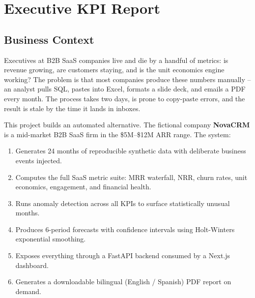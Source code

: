 
\chapter{Executive KPI Report}
\label{ch:kpi}

\section{Business Context}
\label{sec:kpi-context}


Executives at B2B SaaS companies live and die by a handful of metrics: is revenue growing, are customers staying, and is the unit economics engine working? The problem is that most companies produce these numbers manually -- an analyst pulls SQL, pastes into Excel, formats a slide deck, and emails a PDF every month. The process takes two days, is prone to copy-paste errors, and the result is stale by the time it lands in inboxes.

This project builds an automated alternative. The fictional company \textbf{NovaCRM} is a mid-market B2B SaaS firm in the \$5M--\$12M ARR range. The system:
\begin{enumerate}
  \item Generates 24 months of reproducible synthetic data with deliberate business events injected.
  \item Computes the full SaaS metric suite: MRR waterfall, NRR, churn rates, unit economics, engagement, and financial health.
  \item Runs anomaly detection across all KPIs to surface statistically unusual months.
  \item Produces 6-period forecasts with confidence intervals using Holt-Winters exponential smoothing.
  \item Exposes everything through a FastAPI backend consumed by a Next.js dashboard.
  \item Generates a downloadable bilingual (English / Spanish) PDF report on demand.
\end{enumerate}

